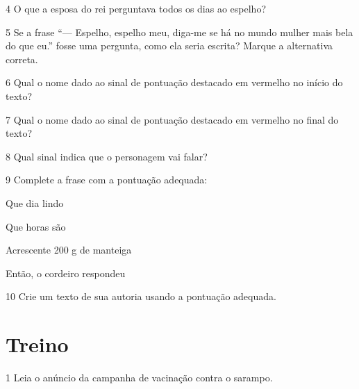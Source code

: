 \num{4} O que a esposa do rei perguntava todos os dias ao espelho?

\num{5} Se a frase ``--- Espelho, espelho meu, diga-me se há no mundo mulher
mais bela do que eu.'' fosse uma pergunta, como ela seria escrita?
Marque a alternativa correta.

\num{6} Qual o nome dado ao sinal de pontuação destacado em vermelho no início do texto? 

\num{7} Qual o nome dado ao sinal de pontuação destacado em vermelho no final do texto? 

\num{8} Qual sinal indica que o personagem vai falar?

\num{9} Complete a frase com a pontuação adequada:

\begin{escolha}
\item Que dia lindo

\item Que horas são

\item Acrescente 200 g de manteiga

\item Então, o cordeiro respondeu
\end{escolha}


\num{10} Crie um texto de sua autoria usando a pontuação adequada.

\pagebreak
\section*{Treino}

\num{1} Leia o anúncio da campanha de vacinação contra o sarampo.


